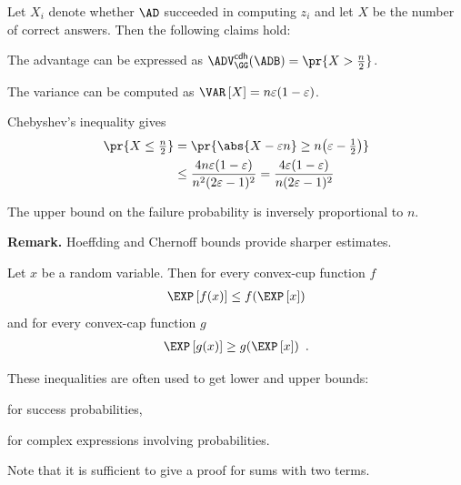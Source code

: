 \documentclass[landscape,footrule]{foils}
\newcommand{\lastline}{\vspace*{-2ex}}
\begin{document}

Let $X_i$ denote whether $\AD$ succeeded in computing $z_i$ and let
$X$ be the number of correct answers. Then the following claims hold:
\begin{triangles}
  \item The advantage can be expressed as $\advCDHXX{\GG}{\ADB}=\pr{X>\frac{n}{2}}$.
  \item The variance can be computed as $\D{X}=n\varepsilon(1-\varepsilon)$.
  \item Chebyshev's inequality gives
    \begin{align*}
      \pr{X\leq \textstyle \frac{n}{2}}&=\pr{\abs{X-\varepsilon n}\geq
      n\bigl(\varepsilon-\textstyle\frac{1}{2}\bigr)}\\
      &\leq\frac{4n\varepsilon(1-\varepsilon)}{n^2(2\varepsilon-1)^2}
      =\frac{4\varepsilon(1-\varepsilon)}{n(2\varepsilon-1)^2}
    \end{align*}
  \item The upper bound on the failure probability is inversely
    proportional to $n$.
\end{triangles}
\bigskip

\textbf{Remark.} Hoeffding and Chernoff
bounds provide sharper estimates.\lastline






Let $x$ be a random variable. Then for every convex-cup 
function $f$
\begin{align*}
  \E{f(x)}\leq f(\E{x})
\end{align*}
and for every convex-cap function $g$
\begin{align*}
  \E{g(x)}\geq g(\E{x})\enspace.
\end{align*}


These inequalities are often used to get lower and upper bounds:
\begin{triangles}
  \item for success probabilities, 
  \item for complex expressions involving probabilities.
\end{triangles}

\enlargethispage{2cm}

Note that it is sufficient to give a proof for sums with two terms.
\end{document}
